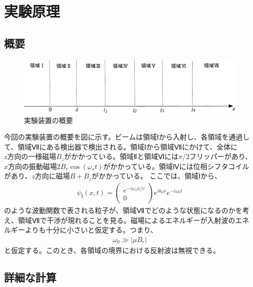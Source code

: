 \def\vector#1{\mbox{\boldmath $#1$}}
\section{実験原理}
\subsection{概要}
\begin{figure}[h]
\begin{center}
\includegraphics[width=13cm]{pi2flipper/zenntaizu.pdf}
\caption{実験装置の概要}
\end{center}
\end{figure}
今回の実験装置の概要を図に示す。ビームは領域Ⅰから入射し、各領域を通過して、領域Ⅶにある検出器で検出される。領域Ⅰから領域Ⅶにかけて、全体に$z方向の一様磁場B_{z}$がかかっている。領域Ⅱと領域Ⅵには$\pi/2フリッパー$があり、$x方向の振動磁場2B_{r}\cos(\omega_{s}t)$がかかっている。領域Ⅳには位相シフタコイルがあり、$z方向に磁場B+B_{z}$がかかっている。
ここでは、領域Ⅰから、
\begin{align}
{\psi}_{Ⅰ}(x,t)=
\begin{pmatrix}
e^{-i\omega_{z}x/v} \\
0
\end{pmatrix}
e^{ik_{0}x}e^{-i\omega_{0}t}
\end{align}
のような波動関数で表される粒子が、領域Ⅶでどのような状態になるのかを考え、領域Ⅶで干渉が現れることを見る。磁場によるエネルギーが入射波のエネルギーよりも十分に小さいと仮定する。つまり、
\begin{align}
\omega_{0} \gg |{\mu}B_{r}|
\end{align}
と仮定する。このとき、各領域の境界における反射波は無視できる。
\subsection{詳細な計算}
